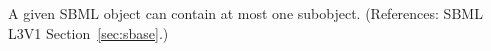 A given SBML object can contain at most one \Notes subobject.  (References:
SBML L3V1 Section~\ref{sec:sbase}.)

